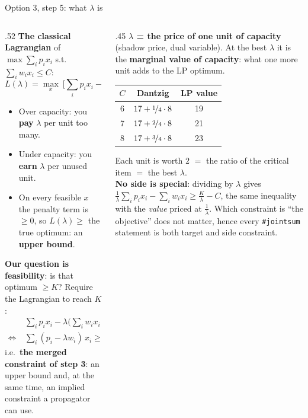 \documentclass[aspectratio=169,11pt]{beamer}
\begin{document}
\begin{frame}{Option 3, step 5: what $\lambda$ is}
\scriptsize
\begin{columns}[T]
\begin{column}{.52\textwidth}
\textbf{The classical Lagrangian} of $\max \sum_i p_i x_i$ s.t.\ $\sum_i w_i x_i \le C$:
\[
L(\lambda) = \max_{x}\ \Big[\sum_i p_i x_i - \lambda\Big(\sum_i w_i x_i - C\Big)\Big],\quad \lambda\ge0 .
\]
\begin{itemize}\setlength\itemsep{1pt}
\item Over capacity: you \textbf{pay} $\lambda$ per unit too many.
\item Under capacity: you \textbf{earn} $\lambda$ per unused unit.
\item On every feasible $x$ the penalty term is $\ge 0$, so $L(\lambda) \ge$ the true optimum: an \textbf{upper bound}.
\end{itemize}
\textbf{Our question is feasibility}: is that optimum $\ge K$? Require the Lagrangian to reach $K$:
\[
\begin{aligned}
&\textstyle\sum_i p_i x_i - \lambda\big(\sum_i w_i x_i - C\big) \ge K\\
\iff\ &\textstyle\sum_i (p_i - \lambda w_i)\,x_i \ge K - \lambda C,
\end{aligned}
\]
i.e.\ \textbf{the merged constraint of step 3}: an upper bound and, at the same time, an implied constraint a propagator can use.
\end{column}
\begin{column}{.45\textwidth}
\textbf{$\lambda$ = the price of one unit of capacity} (shadow price, dual variable). At the best $\lambda$ it is the
\textbf{marginal value of capacity}: what one more unit adds to the LP optimum.
\begin{center}
\begin{tabular}{ccc}\toprule
$C$ & Dantzig & LP value\\\midrule
6 & $17 + \nicefrac14\cdot 8$ & 19\\
7 & $17 + \nicefrac24\cdot 8$ & 21\\
8 & $17 + \nicefrac34\cdot 8$ & 23\\\bottomrule
\end{tabular}
\end{center}
Each unit is worth $2$ $=$ the ratio of the critical item $=$ the best $\lambda$.\\[2mm]
\textbf{No side is special}: dividing by $\lambda$ gives
$\tfrac1\lambda \sum_i p_i x_i - \sum_i w_i x_i \ge \tfrac{K}{\lambda} - C$, the same inequality with the \emph{value}
priced at $\frac1\lambda$. Which constraint is ``the objective'' does not matter, hence every \texttt{\#jointsum}
statement is both target and side constraint.
\end{column}
\end{columns}
\end{frame}
\end{document}
